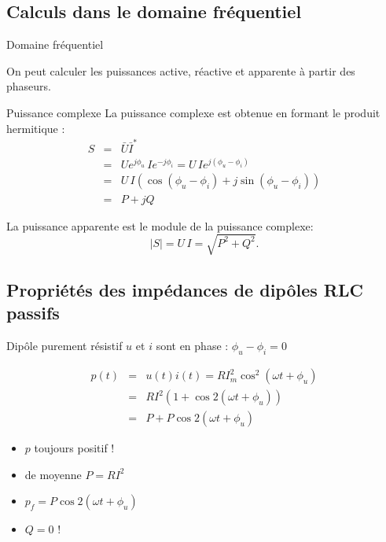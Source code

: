 	\subsection{Calculs dans le domaine fréquentiel}
	\begin{frame}{Domaine fréquentiel}
		
		On peut calculer les puissances active, réactive et apparente à partir des phaseurs. 
		
		\begin{block}{Puissance complexe}
		La puissance complexe est obtenue en formant le produit hermitique :
		\begin{eqnarray*}
			S&=&\bar{U}\bar{I}^*\\
			& = & Ue^{j\phi_u}\,Ie^{-j\phi_i}= U\, Ie^{j(\phi_u-\phi_i)}\\
			& = & U\,I \left(\cos(\phi_u-\phi_i)+j\sin(\phi_u-\phi_i)\right)\\
			& = & P + j Q			
		\end{eqnarray*}
	\end{block}
	
	La puissance apparente est le module de la puissance complexe:
	$$|S|=U\,I=\sqrt{P^2+Q^2}.$$

	\end{frame}
	
	\subsection{Propriétés des impédances de dipôles RLC passifs}	
	\begin{frame}{Dipôle purement résistif}
		$u$ et $i$ sont en phase : $\phi_u-\phi_i=0$
		
		\begin{eqnarray*}
			p(t)& = &u(t)i(t)=RI_m^2\cos^2(\omega t + \phi_u)\\
			& =& RI^2(1+\cos 2(\omega t + \phi_u))\\
			& = & P + P \cos 2(\omega t+ \phi_u)
		\end{eqnarray*}
		
		\begin{itemize}
		\item $p$ toujours positif !
		\item de moyenne $P=RI^2$
		\item $p_f= P \cos 2(\omega t+ \phi_u)$
		\item $Q=0$ !
		\end{itemize}

	\end{frame}
	
